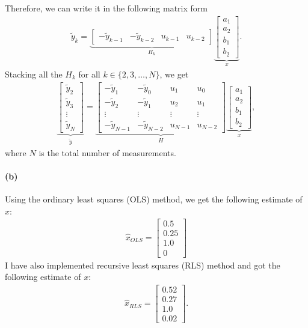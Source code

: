 Therefore, we can write it in the following matrix form
\begin{align}
	\tilde{y}_k = \underbrace{\begin{bmatrix}-\tilde{y}_{k-1} & -\tilde{y}_{k-2} & u_{k-1} & u_{k-2}\end{bmatrix}}_{H_k}\underbrace{\begin{bmatrix}a_1\\a_2\\b_1\\b_2\end{bmatrix}}_{x}.
\end{align}
Stacking all the $H_k$ for all $k \in \{2,3,\ldots,N\}$, we get
\begin{align*}
	\underbrace{\begin{bmatrix}\tilde{y}_2\\\tilde{y}_3\\\vdots\\\tilde{y}_N\end{bmatrix}}_{\tilde{y}} = \underbrace{\begin{bmatrix}-\tilde{y}_{1} & -\tilde{y}_0 & u_1 & u_0\\-\tilde{y}_2 & -\tilde{y}_1 & u_2 & u_1\\ \vdots & \vdots & \vdots & \vdots\\-\tilde{y}_{N-1} & -\tilde{y}_{N-2} & u_{N-1} & u_{N-2}\end{bmatrix}}_{H} \underbrace{\begin{bmatrix}a_1\\a_2\\b_1\\b_2\end{bmatrix}}_{x},
\end{align*}
where $N$ is the total number of measurements.
\paragraph{(b)} Using the ordinary least squares (OLS) method, we get the following estimate of $x$:
\begin{align}
	\hat{x}_{OLS} = \begin{bmatrix}0.5\\0.25\\1.0\\0\end{bmatrix}
\end{align}
I have also implemented recursive least squares (RLS) method and got the following estimate of $x$:
\begin{align}
\hat{x}_{RLS} = \begin{bmatrix}0.52\\0.27\\1.0\\0.02\end{bmatrix}.
\end{align}
